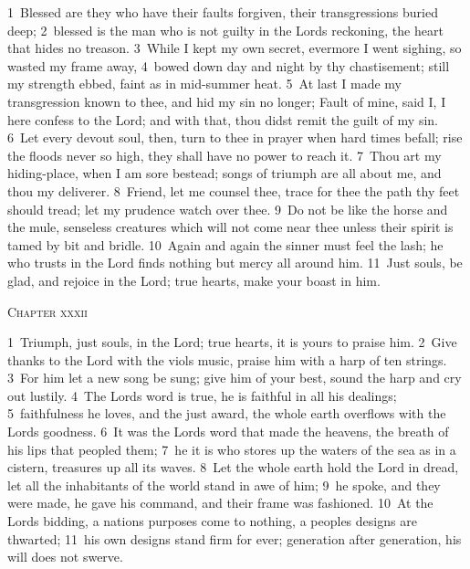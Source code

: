 \documentclass[10pt]{book} %
\begin{document}
\textcolor{benred8}{1}~Blessed are they who have their faults forgiven, their transgressions buried deep; \textcolor{benred8}{2}~blessed is the man who is not guilty in the Lord\textquotesingle s reckoning, the heart that hides no treason. \textcolor{benred8}{3}~While I kept my own secret, evermore I went sighing, so wasted my frame away, \textcolor{benred8}{4}~bowed down day and night by thy chastisement; still my strength ebbed, faint as in mid-summer heat. \textcolor{benred8}{5}~At last I made my transgression known to thee, and hid my sin no longer; Fault of mine, said I, I here confess to the Lord; and with that, thou didst remit the guilt of my sin. \textcolor{benred8}{6}~Let every devout soul, then, turn to thee in prayer when hard times befall; rise the floods never so high, they shall have no power to reach it. \textcolor{benred8}{7}~Thou art my hiding-place, when I am sore bestead; songs of triumph are all about me, and thou my deliverer.
\textcolor{benred8}{8}~Friend, let me counsel thee, trace for thee the path thy feet should tread; let my prudence watch over thee. \textcolor{benred8}{9}~Do not be like the horse and the mule, senseless creatures which will not come near thee unless their spirit is tamed by bit and bridle. \textcolor{benred8}{10}~Again and again the sinner must feel the lash; he who trusts in the Lord finds nothing but mercy all around him. \textcolor{benred8}{11}~Just souls, be glad, and rejoice in the Lord; true hearts, make your boast in him.
\begin{large}\begin{center}\textsc{Chapter xxxii}\end{center}\end{large}
\textcolor{benred8}{1}~Triumph, just souls, in the Lord; true hearts, it is yours to praise him. \textcolor{benred8}{2}~Give thanks to the Lord with the viol\textquotesingle s music, praise him with a harp of ten strings. \textcolor{benred8}{3}~For him let a new song be sung; give him of your best, sound the harp and cry out lustily. \textcolor{benred8}{4}~The Lord\textquotesingle s word is true, he is faithful in all his dealings; \textcolor{benred8}{5}~faithfulness he loves, and the just award, the whole earth overflows with the Lord\textquotesingle s goodness. \textcolor{benred8}{6}~It was the Lord\textquotesingle s word that made the heavens, the breath of his lips that peopled them; \textcolor{benred8}{7}~he it is who stores up the waters of the sea as in a cistern, treasures up all its waves. \textcolor{benred8}{8}~Let the whole earth hold the Lord in dread, let all the inhabitants of the world stand in awe of him; \textcolor{benred8}{9}~he spoke, and they were made, he gave his command, and their frame was fashioned. \textcolor{benred8}{10}~At the Lord\textquotesingle s bidding, a nation\textquotesingle s purposes come to nothing, a people\textquotesingle s designs are thwarted; \textcolor{benred8}{11}~his own designs stand firm for ever; generation after generation, his will does not swerve.
\end{document}
